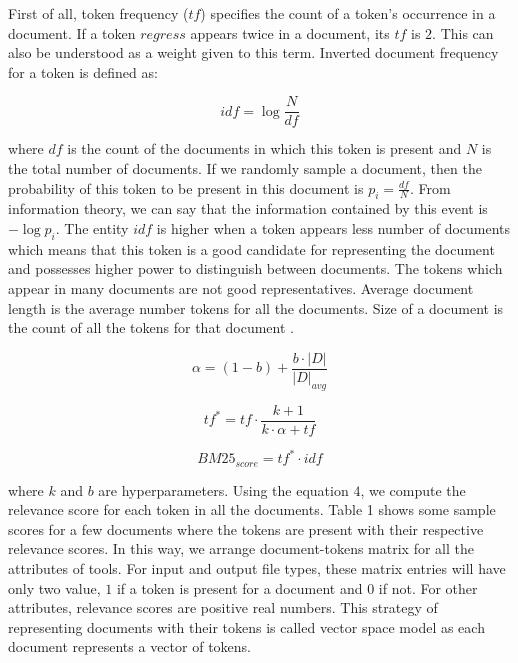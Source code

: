 First of all, token frequency ($tf$) specifies the count of a token's occurrence in a document. If a token $regress$ appears twice in a document, its $tf$ is $2$. This can also be understood as a weight given to this term. Inverted document frequency for a token is defined as:

\begin{equation}
idf = \log \frac{N}{df}
\end{equation}
 
where $df$ is the count of the documents in which this token is present and $N$ is the total number of documents. If we randomly sample a document, then the probability of this token to be present in this document is $ p_i = \frac{df}{N} $. From information theory, we can say that the information contained by this event is $ - \log p_i $. The entity $idf$ is higher when a token appears less number of documents which means that this token is a good candidate for representing the document and possesses higher power to distinguish between documents. The tokens which appear in many documents are not good representatives. Average document length is the average number tokens for all the documents. Size of a document is the count of all the tokens for that document \cite{Robertson:2009:PRF:1704809.1704810}. 


\begin{equation}
\alpha = (1-b) + \frac{b \cdot |D|}{|D|_{avg}}
\end{equation}

\begin{equation}
tf^* = tf \cdot \frac{k+1}{k \cdot \alpha + tf}
\end{equation}

\begin{equation}
BM25_{score} =tf^* \cdot idf
\end{equation}

where $k$ and $b$ are hyperparameters. Using the equation $4$, we compute the relevance score for each token in all the documents. Table 1 shows some sample scores for a few documents where the tokens are present with their respective relevance scores. In this way, we arrange document-tokens matrix for all the attributes of tools. For input and output file types, these matrix entries will have only two value, $1$ if a token is present for a document and $0$ if not. For other attributes, relevance scores are positive real numbers. This strategy of representing documents with their tokens is called vector space model as each document represents a vector of tokens.

